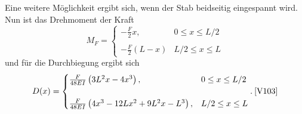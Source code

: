 Eine weitere Möglichkeit ergibt sich, wenn der Stab beidseitig eingespannt wird. Nun ist das Drehmoment der Kraft
\begin{equation}
    M_F = 
    \begin{cases}
        -\frac{F}{2}x, & 0 \leq x \leq L/2 \\
        \\
        -\frac{F}{2}(L-x) & L/2 \leq x \leq L
    \end{cases}
    \label{eq:drehmoment_beidseitig}
\end{equation}
und für die Durchbiegung ergibt sich
\begin{equation}
    D(x) = 
    \begin{cases}
        \frac{F}{48EI} \left( 3L^2x - 4x^3 \right), & 0 \leq x \leq L/2 \\
        \\
        \frac{F}{48EI} \left( 4x^3 - 12Lx^2 + 9L^2x - L^3 \right), & L/2 \leq x \leq L
    \end{cases}
    . \: \text{\cite{V103}}
    \label{eq:durchbiegung_beidseitig}
\end{equation}
